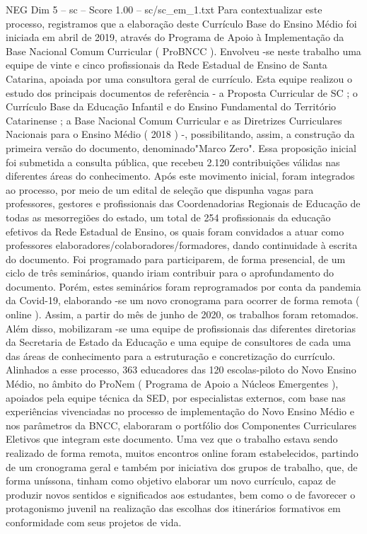 \begin{textsample}{NEG Dim 5 – sc – Score 1.00 – sc/sc\_em\_1.txt}
Para contextualizar este processo, registramos que a elaboração deste Currículo Base do Ensino Médio foi iniciada em abril de 2019, através do Programa de Apoio à Implementação da Base Nacional Comum Curricular ( ProBNCC ).
Envolveu -se neste trabalho uma equipe de vinte e cinco profissionais da Rede Estadual de Ensino de Santa Catarina, apoiada por uma consultora geral de currículo.
Esta equipe realizou o estudo dos principais documentos de referência - a Proposta Curricular de SC ; o Currículo Base da Educação Infantil e do Ensino Fundamental do Território Catarinense ; a Base Nacional Comum Curricular e as Diretrizes Curriculares Nacionais para o Ensino Médio ( 2018 ) -, possibilitando, assim, a construção da primeira versão do documento, denominado"Marco Zero".
Essa proposição inicial foi submetida a consulta pública, que recebeu 2.120 contribuições válidas nas diferentes áreas do conhecimento.
Após este movimento inicial, foram integrados ao processo, por meio de um edital de seleção que dispunha vagas para professores, gestores e profissionais das Coordenadorias Regionais de Educação de todas as mesorregiões do estado, um total de 254 profissionais da educação efetivos da Rede Estadual de Ensino, os quais foram convidados a atuar como professores elaboradores/colaboradores/formadores, dando continuidade à escrita do documento.
Foi programado para participarem, de forma presencial, de um ciclo de três seminários, quando iriam contribuir para o aprofundamento do documento.
Porém, estes seminários foram reprogramados por conta da pandemia da Covid-19, elaborando -se um novo cronograma para ocorrer de forma remota ( online ).
Assim, a partir do mês de junho de 2020, os trabalhos foram retomados.
Além disso, mobilizaram -se uma equipe de profissionais das diferentes diretorias da Secretaria de Estado da Educação e uma equipe de consultores de cada uma das áreas de conhecimento para a estruturação e concretização do currículo.
Alinhados a esse processo, 363 educadores das 120 escolas-piloto do Novo Ensino Médio, no âmbito do ProNem ( Programa de Apoio a Núcleos Emergentes ), apoiados pela equipe técnica da SED, por especialistas externos, com base nas experiências vivenciadas no processo de implementação do Novo Ensino Médio e nos parâmetros da BNCC, elaboraram o portfólio dos Componentes Curriculares Eletivos que integram este documento.
Uma vez que o trabalho estava sendo realizado de forma remota, muitos encontros online foram estabelecidos, partindo de um cronograma geral e também por iniciativa dos grupos de trabalho, que, de forma uníssona, tinham como objetivo elaborar um novo currículo, capaz de produzir novos sentidos e significados aos estudantes, bem como o de favorecer o protagonismo juvenil na realização das escolhas dos itinerários formativos em conformidade com seus projetos de vida.

\end{textsample}
